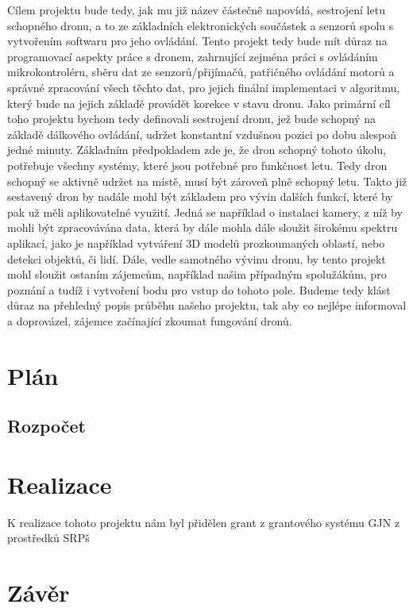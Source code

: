 \documentclass[12pt]{report}
\begin{document}
Cílem projektu bude tedy, jak mu již název částečně napovídá, sestrojení letu schopného dronu, a to ze základních elektronických součástek a senzorů spolu s vytvořením softwaru pro jeho ovládání. Tento projekt tedy bude mít důraz na programovací aspekty práce s dronem, zahrnující zejména práci s ovládáním mikrokontroléru, sběru dat ze senzorů/přijímačů, patřičného ovládání motorů a správné zpracování všech těchto dat, pro jejich finální implementaci v algoritmu, který bude na jejich základě provádět korekce v stavu dronu. Jako primární cíl toho projektu bychom tedy definovali sestrojení dronu, jež bude schopný na základě dálkového ovládání, udržet konstantní vzdušnou pozici po dobu alespoň jedné minuty. Základním předpokladem zde je, že dron schopný tohoto úkolu, potřebuje všechny systémy, které jsou potřebné pro funkčnost letu. Tedy dron schopný se aktivně udržet na místě, musí být zároveň plně schopný letu. Takto již sestavený dron by nadále mohl být základem pro vývin dalších funkcí, které by pak už měli aplikovatelné využití. Jedná se například o instalaci kamery, z níž by mohli být zpracovávána data, která by dále mohla dále sloužit širokému spektru aplikací, jako je například vytváření 3D modelů prozkoumaných oblastí, nebo detekci objektů, či lidí. Dále, vedle samotného vývinu dronu, by tento projekt mohl sloužit ostaním zájemcům, například našim případným spolužákům, pro poznání a tudíž i vytvoření bodu pro vstup do tohoto pole. Budeme tedy klást důraz na přehledný popis průběhu našeho projektu, tak aby co nejlépe informoval a doprovázel, zájemce začínající zkoumat fungování dronů.



\chapter{Plán}
\section{Rozpočet}

\chapter{Realizace}
K realizace tohoto projektu nám byl přidělen grant z grantového systému GJN z prostředků SRPš

\chapter{Závěr}
\end{document}
